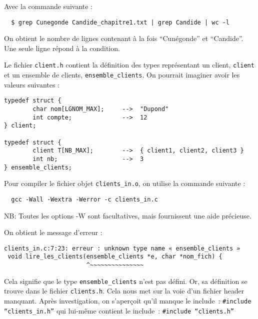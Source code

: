 \documentclass[10pt]{article}
\begin{document}
\begin{enumerate}[label=\textbf{[\alph*]}]
\item Avec la commande suivante :

\begin{verbatim}
  $ grep Cunegonde Candide_chapitre1.txt | grep Candide | wc -l
\end{verbatim}

  On obtient le nombre de lignes contenant à la fois ``Cunégonde'' et
  ``Candide''. Une seule ligne répond à la condition.

\item Le fichier \texttt{client.h} contient la définition des types
  représentant un client, \texttt{client} et un ensemble de clients,
  \texttt{ensemble\_clients}. On pourrait imaginer avoir les valeurs
  suivantes :

\begin{verbatim}
typedef struct {
        char nom[LGNOM_MAX];     -->  "Dupond"
        int compte;              -->  12
} client;

typedef struct {
        client T[NB_MAX];        -->  { client1, client2, client3 }
        int nb;                  -->  3
} ensemble_clients;

\end{verbatim}

\item Pour compiler le fichier objet \texttt{clients\_in.o}, on
  utilise la commande suivante :

\begin{verbatim}
  gcc -Wall -Wextra -Werror -c clients_in.c
\end{verbatim}

  NB: Toutes les options -W sont facultatives, mais fournissent une
  aide précieuse.

  On obtient le message d'erreur :

\begin{verbatim}
clients_in.c:7:23: erreur : unknown type name « ensemble_clients »
 void lire_les_clients(ensemble_clients *e, char *nom_fich) {
                       ^~~~~~~~~~~~~~~~

\end{verbatim}

  Cela signifie que le type \texttt{ensemble\_clients} n'est pas
  défini. Or, sa définition se trouve dans le fichier
  \texttt{clients.h}. Cela nous met sur la voie d'un fichier header
  manquant. Après investigation, on s'aperçoit qu'il manque le
  include~: \texttt{\#include ``clients\_in.h''} qui lui-même contient
  le include~: \texttt{\#include ``clients.h''}


\end{enumerate}
\end{document}
